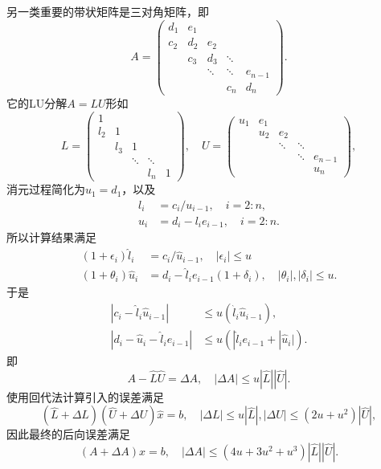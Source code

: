 \documentclass[a4paper,10pt]{ctexart}
\begin{document}
另一类重要的带状矩阵是三对角矩阵，即
\[
    A = 
    \begin{pmatrix}
        d_1 & e_1 & & & \\
        c_2 & d_2 & e_2 & & \\
        & c_3 & d_3 & \ddots & \\
        & & \ddots & \ddots & e_{n-1} \\
        & & & c_{n} & d_n
    \end{pmatrix}.
\]
它的LU分解$ A = LU $形如
\[
    L = 
    \begin{pmatrix}
        1 & & & & \\
        l_2 & 1 & & & \\
        & l_3 & 1 & & \\
        & & \ddots & \ddots & \\
        & & & l_n & 1
    \end{pmatrix},\quad U =
    \begin{pmatrix}
        u_1 & e_1 & & & \\
        & u_2 & e_2 & & \\
        & & \ddots & \ddots & \\
        & & & \ddots & e_{n-1} \\
        & & & &  u_n
    \end{pmatrix},
\]
消元过程简化为$ u_1 = d_1 $，以及
\[
    \begin{aligned}
        l_i &= c_i / u_{i-1},\quad i=2:n,\\
        u_i &= d_i - l_i e_{i-1},\quad i=2:n.
    \end{aligned}
\]
所以计算结果满足
\[
    \begin{aligned}
        (1+\epsilon_i)\hat{l}_i &= c_i / \hat{u}_{i-1},\quad |\epsilon_i|\leqslant u\\
        (1+\theta_i)\hat{u}_i &= d_i - \hat{l}_i e_{i-1}(1+\delta_i),\quad |\theta_i|,|\delta_i|\leqslant u.
    \end{aligned}  
\]
于是
\[
    \begin{aligned}
        |c_i - \hat{l}_i \hat{u}_{i-1}| &\leqslant  u(\hat{l}_i \hat{u}_{i-1}),\\
        |d_i - \hat{u}_i - \hat{l}_ie_{i-1}| &\leqslant  u(|\hat{l}_{i} e_{i-1} +|\hat{u}_{i}|).
    \end{aligned}
\]
即
\begin{equation}
    A - \hat{L} \hat{U} = \Delta A, \quad |\Delta A| \leqslant u|\hat{L}| |\hat{U}|.
\end{equation}
使用回代法计算引入的误差满足
\begin{equation}
    (\hat{L}+\Delta L)(\hat{U} + \Delta U)\hat{x} = b,\quad |\Delta L|\leqslant u|\hat{L}|,|\Delta U| \leqslant (2u+u^2)|\hat{U}|,
\end{equation}
因此最终的后向误差满足
\begin{equation}
    (A+\Delta A)\hat{x} = b,\quad |\Delta A| \leqslant (4u+3u^2+u^3)|\hat{L}| |\hat{U}|.
\end{equation}
\end{document}
